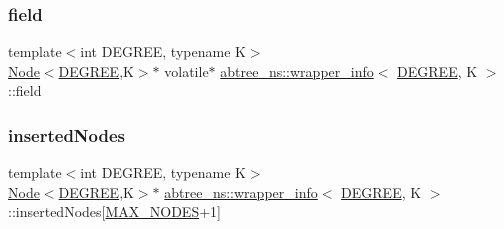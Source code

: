 \mbox{\label{classabtree__ns_1_1wrapper__info_a768ca52b1b5ec8730ea982e9a8aaeb48}} 
\subsubsection{\texorpdfstring{field}{field}}
{\footnotesize\ttfamily template$<$int D\+E\+G\+R\+EE, typename K$>$ \\
\hyperlink{structabtree__ns_1_1Node}{Node}$<$\hyperlink{brown__sigouin__abtree__kcas_2adapter_8h_a5d88b17d70c985f2f2b8e987037fd6dd}{D\+E\+G\+R\+EE},K$>$$\ast$ volatile$\ast$ \hyperlink{classabtree__ns_1_1wrapper__info}{abtree\+\_\+ns\+::wrapper\+\_\+info}$<$ \hyperlink{brown__sigouin__abtree__kcas_2adapter_8h_a5d88b17d70c985f2f2b8e987037fd6dd}{D\+E\+G\+R\+EE}, K $>$\+::field}

\mbox{\label{classabtree__ns_1_1wrapper__info_a195b04f001a1df664ccf438f289a6990}} 
\subsubsection{\texorpdfstring{inserted\+Nodes}{insertedNodes}}
{\footnotesize\ttfamily template$<$int D\+E\+G\+R\+EE, typename K$>$ \\
\hyperlink{structabtree__ns_1_1Node}{Node}$<$\hyperlink{brown__sigouin__abtree__kcas_2adapter_8h_a5d88b17d70c985f2f2b8e987037fd6dd}{D\+E\+G\+R\+EE},K$>$$\ast$ \hyperlink{classabtree__ns_1_1wrapper__info}{abtree\+\_\+ns\+::wrapper\+\_\+info}$<$ \hyperlink{brown__sigouin__abtree__kcas_2adapter_8h_a5d88b17d70c985f2f2b8e987037fd6dd}{D\+E\+G\+R\+EE}, K $>$\+::inserted\+Nodes\mbox{[}\hyperlink{classabtree__ns_1_1wrapper__info_a8ebdd932eb6c4c88615fbb76b8419d9e}{M\+A\+X\+\_\+\+N\+O\+D\+ES}+1\mbox{]}}

\mbox{\label{classabtree__ns_1_1wrapper__info_a8ebdd932eb6c4c88615fbb76b8419d9e}} 
